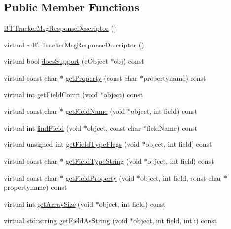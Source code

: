 \subsection*{Public Member Functions}
\begin{DoxyCompactItemize}
\item 
\hyperlink{classBTTrackerMsgResponseDescriptor_a05939bc9d9af6e40c947dfbff2d8fdb7}{B\+T\+Tracker\+Msg\+Response\+Descriptor} ()
\item 
virtual \hyperlink{classBTTrackerMsgResponseDescriptor_a63db46db1fe85942d3509530d086444c}{$\sim$\+B\+T\+Tracker\+Msg\+Response\+Descriptor} ()
\item 
virtual bool \hyperlink{classBTTrackerMsgResponseDescriptor_adbd2c9bfe42a6134af457c074a8b145a}{does\+Support} (c\+Object $\ast$obj) const 
\item 
virtual const char $\ast$ \hyperlink{classBTTrackerMsgResponseDescriptor_a2e3a9360ba4a0e1337f3061ff21186ef}{get\+Property} (const char $\ast$propertyname) const 
\item 
virtual int \hyperlink{classBTTrackerMsgResponseDescriptor_a43cebef6290c4d77aaeee0cc599df9c7}{get\+Field\+Count} (void $\ast$object) const 
\item 
virtual const char $\ast$ \hyperlink{classBTTrackerMsgResponseDescriptor_a141e3bfbd0ce24dbbaac8842e5e4cdbc}{get\+Field\+Name} (void $\ast$object, int field) const 
\item 
virtual int \hyperlink{classBTTrackerMsgResponseDescriptor_ac5eb56575f8859b9ff33f7da03cee7f8}{find\+Field} (void $\ast$object, const char $\ast$field\+Name) const 
\item 
virtual unsigned int \hyperlink{classBTTrackerMsgResponseDescriptor_a280176fe000d80d350364411a4870fe6}{get\+Field\+Type\+Flags} (void $\ast$object, int field) const 
\item 
virtual const char $\ast$ \hyperlink{classBTTrackerMsgResponseDescriptor_a3c2159c41d35a6e8eb1d0d30596e0c42}{get\+Field\+Type\+String} (void $\ast$object, int field) const 
\item 
virtual const char $\ast$ \hyperlink{classBTTrackerMsgResponseDescriptor_a074e903622a2f806abe6ccd265fd0032}{get\+Field\+Property} (void $\ast$object, int field, const char $\ast$propertyname) const 
\item 
virtual int \hyperlink{classBTTrackerMsgResponseDescriptor_a07844fd76301c4cd23bed8921cf0617e}{get\+Array\+Size} (void $\ast$object, int field) const 
\item 
virtual std\+::string \hyperlink{classBTTrackerMsgResponseDescriptor_a8887ee254ea3ccfb5f659a274230952b}{get\+Field\+As\+String} (void $\ast$object, int field, int i) const 

\end{DoxyCompactItemize}
